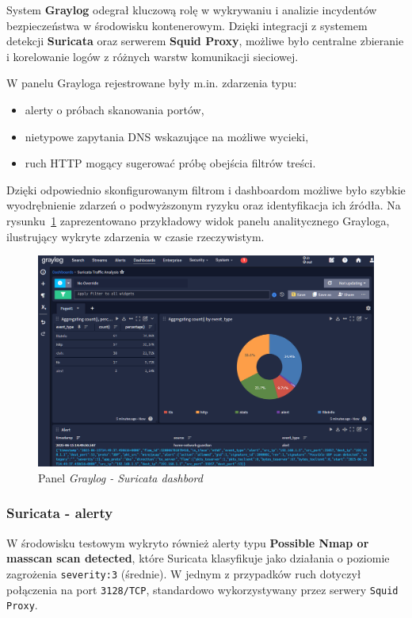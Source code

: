 \documentclass[
    left=2.5cm,         %
    right=2.5cm,        %
    top=2.5cm,          %
    bottom=3cm,         %
    bindingoffset=6mm,  %
    nohyphenation=true %
]{eiti/eiti-thesis} %
\begin{document}
System \textbf{Graylog} odegrał kluczową rolę w wykrywaniu i analizie incydentów bezpieczeństwa w środowisku kontenerowym. Dzięki integracji z systemem detekcji \textbf{Suricata} oraz serwerem \textbf{Squid Proxy}, możliwe było centralne zbieranie i korelowanie logów z różnych warstw komunikacji sieciowej.

W panelu Grayloga rejestrowane były m.in. zdarzenia typu:
\begin{itemize}
\item alerty o próbach skanowania portów,
\item nietypowe zapytania DNS wskazujące na możliwe wycieki,
\item ruch HTTP mogący sugerować próbę obejścia filtrów treści.
\end{itemize}

Dzięki odpowiednio skonfigurowanym filtrom i dashboardom możliwe było szybkie wyodrębnienie zdarzeń o podwyższonym ryzyku oraz identyfikacja ich źródła. Na rysunku~\ref{fig:graylog-suricata-dashboard} zaprezentowano przykładowy widok panelu analitycznego Grayloga, ilustrujący wykryte zdarzenia w czasie rzeczywistym.

\begin{figure}[H]
    \centering
    \includegraphics[width=\textwidth]{img/graylog_alerts.png}
    \caption{Panel \textit{Graylog - Suricata dashbord}}
    \label{fig:graylog-suricata-dashboard}
\end{figure}


\subsubsection{Suricata - alerty}
W środowisku testowym wykryto również alerty typu \textbf{Possible Nmap or masscan scan detected}, które Suricata klasyfikuje jako działania o poziomie zagrożenia \texttt{severity:3} (średnie). W jednym z przypadków ruch dotyczył połączenia na port \texttt{3128/TCP}, standardowo wykorzystywany przez serwery \texttt{Squid Proxy}.
\end{document}

